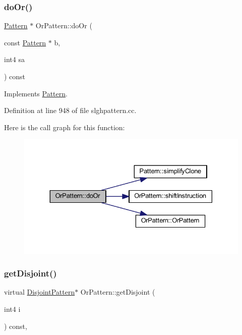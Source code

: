 \subsubsection{\texorpdfstring{doOr()}{doOr()}}
{\footnotesize\ttfamily \mbox{\hyperlink{class_pattern}{Pattern}} $\ast$ Or\+Pattern\+::do\+Or (\begin{DoxyParamCaption}\item[{const \mbox{\hyperlink{class_pattern}{Pattern}} $\ast$}]{b,  }\item[{int4}]{sa }\end{DoxyParamCaption}) const\hspace{0.3cm}{\ttfamily [virtual]}}



Implements \mbox{\hyperlink{class_pattern_a130c23bfea1cb4a1c6e83edf9e2503d3}{Pattern}}.



Definition at line 948 of file slghpattern.\+cc.

Here is the call graph for this function\+:
\nopagebreak
\begin{figure}[H]
\begin{center}
\leavevmode
\includegraphics[width=330pt]{class_or_pattern_a969bd58751ab797ec77e4c0c74168410_cgraph}
\end{center}
\end{figure}
\mbox{\label{class_or_pattern_a0d788a68161acca8b39f4fd999a7b9d8}} 
\subsubsection{\texorpdfstring{getDisjoint()}{getDisjoint()}}
{\footnotesize\ttfamily virtual \mbox{\hyperlink{class_disjoint_pattern}{Disjoint\+Pattern}}$\ast$ Or\+Pattern\+::get\+Disjoint (\begin{DoxyParamCaption}\item[{int4}]{i }\end{DoxyParamCaption}) const\hspace{0.3cm}{\ttfamily [inline]}, {\ttfamily [virtual]}}



